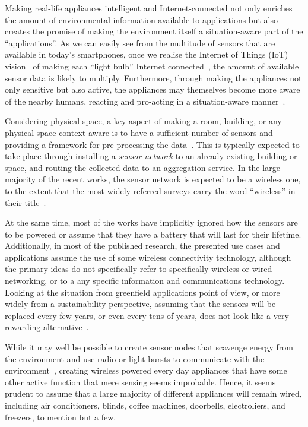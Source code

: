 \documentclass[final]{siamltex}
\begin{document}
Making real-life appliances intelligent and Internet-connected not
only enriches the amount of environmental information available to
applications but also creates the promise of making the environment
itself a situation-aware part of the ``applications''.  As we can
easily see from the multitude of sensors that are available in today's
smartphones, once we realise the Internet of Things (IoT)
vision~\cite{Atzori20102787} of making each ``light bulb'' Internet
connected~\cite{cerf1997next}, the amount of available sensor data is
likely to multiply.  Furthermore, through making the appliances not
only sensitive but also active, the appliances may themselves become
more aware of the nearby humans, reacting and pro-acting in a
situation-aware manner~\cite{kindberg2002people}.

Considering physical space, a key aspect of making a room, building,
or any physical space context aware is to have a sufficient number of
sensors and providing a framework for pre-processing the
data~\cite{Baldauf2007a}.  This is typically expected to take place
through installing a {\it sensor network} to an already existing
building or space, and routing the collected data to an aggregation
service.  In the large majority of the recent works, the sensor
network is expected to be a wireless one, to the extent that the most
widely referred surveys carry the word ``wireless'' in their
title~\cite{akkaya2005survey, akyildiz2002wireless}.

At the same time, most of the works have implicitly ignored how the
sensors are to be powered or assume that they have a battery that will
last for their lifetime.  Additionally, in most of the published
research, the presented use cases and applications assume the use of
some wireless connectivity technology, although the primary ideas do
not specifically refer to specifically wireless or wired networking,
or to a any specific information and communications technology.
Looking at the situation from greenfield applications point of view,
or more widely from a sustainability perspective, assuming that the
sensors will be replaced every few years, or even every tens of years, does
not look like a very rewarding alternative~\cite{rowland2002prevalence}.

While it may well be possible to create sensor nodes that scavenge
energy from the environment and use radio or light bursts to
communicate with the environment~\cite{wang2010toward}, creating
wireless powered every day appliances that have some other active
function that mere sensing seems improbable.  Hence, it seems prudent
to assume that a large majority of different appliances will remain
wired, including air conditioners, blinds, coffee machines, doorbells,
electroliers, and freezers, to mention but a few.
\end{document}
